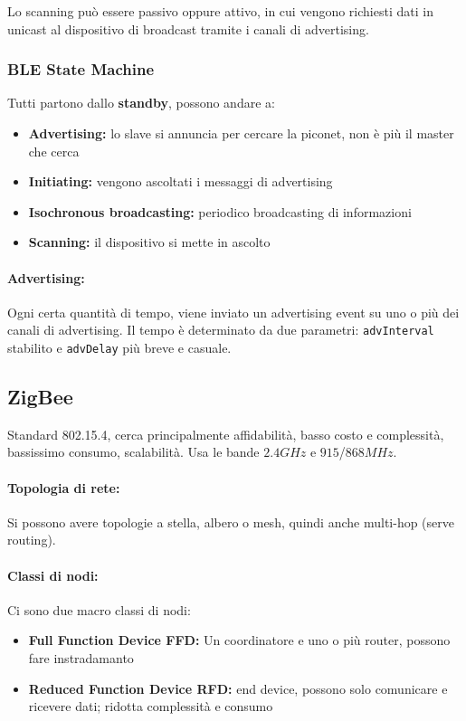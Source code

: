 Lo scanning può essere passivo oppure attivo, in cui vengono richiesti dati in unicast al dispositivo di broadcast tramite i canali di advertising.

\subsubsection{BLE State Machine}

Tutti partono dallo \textbf{standby}, possono andare a:
\begin{itemize}
    \item \textbf{Advertising:} lo slave si annuncia per cercare la piconet, non è più il master che cerca
    
    \item \textbf{Initiating:} vengono ascoltati i messaggi di advertising
    
    \item \textbf{Isochronous broadcasting:} periodico broadcasting di informazioni 
    
    \item \textbf{Scanning:} il dispositivo si mette in ascolto
\end{itemize}

\paragraph{Advertising:} Ogni certa quantità di tempo, viene inviato un advertising event su uno o più dei canali di advertising. Il tempo è determinato da due parametri: \texttt{advInterval} stabilito e \texttt{advDelay} più breve e casuale.

\subsection{ZigBee}

Standard 802.15.4, cerca principalmente affidabilità, basso costo e complessità, bassissimo consumo, scalabilità. Usa le bande $2.4GHz$ e $915$/$868MHz$.

\paragraph{Topologia di rete:} Si possono avere topologie a stella, albero o mesh, quindi anche multi-hop (serve routing).

\paragraph{Classi di nodi:} Ci sono due macro classi di nodi:
\begin{itemize}
    \item \textbf{Full Function Device FFD:} Un coordinatore e uno o più router, possono fare instradamanto
    
    \item \textbf{Reduced Function Device RFD:} end device, possono solo comunicare e ricevere dati; ridotta complessità e consumo
\end{itemize}


